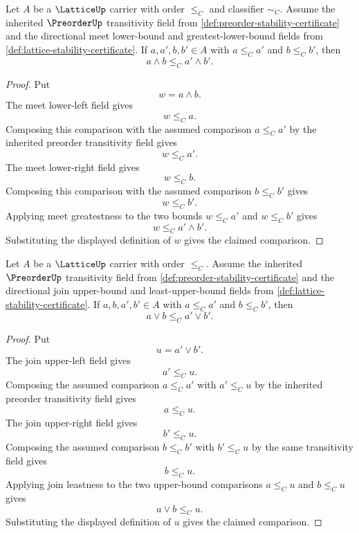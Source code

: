 \begin{lemma}
\label{lem:lattice-meet-two-sided-monotonicity-from-directional-bounds}
Let $A$ be a $\LatticeUp$ carrier with order $\le_C$ and classifier $\sim_C$. Assume the inherited $\PreorderUp$ transitivity field from \autoref{def:preorder-stability-certificate} and the directional meet lower-bound and greatest-lower-bound fields from \autoref{def:lattice-stability-certificate}. If $a,a',b,b'\in A$ with $a\le_C a'$ and $b\le_C b'$, then
$$
a\wedge b\le_C a'\wedge b'.
$$
\end{lemma}
\begin{proof}
Put
$$
w=a\wedge b.
$$
The meet lower-left field gives
$$
w\le_C a.
$$
Composing this comparison with the assumed comparison $a\le_C a'$ by the inherited preorder transitivity field gives
$$
w\le_C a'.
$$
The meet lower-right field gives
$$
w\le_C b.
$$
Composing this comparison with the assumed comparison $b\le_C b'$ gives
$$
w\le_C b'.
$$
Applying meet greatestness to the two bounds $w\le_C a'$ and $w\le_C b'$ gives
$$
w\le_C a'\wedge b'.
$$
Substituting the displayed definition of $w$ gives the claimed comparison.
\end{proof}

\begin{lemma}
\label{lem:lattice-join-two-sided-monotonicity-from-directional-bounds}
Let $A$ be a $\LatticeUp$ carrier with order $\le_C$. Assume the inherited $\PreorderUp$ transitivity field from \autoref{def:preorder-stability-certificate} and the directional join upper-bound and least-upper-bound fields from \autoref{def:lattice-stability-certificate}. If $a,b,a',b'\in A$ with $a\le_C a'$ and $b\le_C b'$, then
$$
a\vee b\le_C a'\vee b'.
$$
\end{lemma}
\begin{proof}
Put
$$
u=a'\vee b'.
$$
The join upper-left field gives
$$
a'\le_C u.
$$
Composing the assumed comparison $a\le_C a'$ with $a'\le_C u$ by the inherited preorder transitivity field gives
$$
a\le_C u.
$$
The join upper-right field gives
$$
b'\le_C u.
$$
Composing the assumed comparison $b\le_C b'$ with $b'\le_C u$ by the same transitivity field gives
$$
b\le_C u.
$$
Applying join leastness to the two upper-bound comparisons $a\le_C u$ and $b\le_C u$ gives
$$
a\vee b\le_C u.
$$
Substituting the displayed definition of $u$ gives the claimed comparison.
\end{proof}

